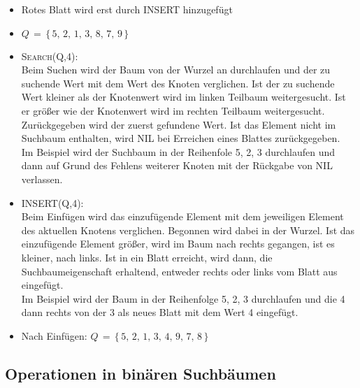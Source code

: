   \begin{itemize}
   \item Rotes Blatt wird erst durch INSERT hinzugefügt
   \item $Q\,=\,\{\,5,\,2,\,1,\,3,\,8,\,7,\,9\,\}$
   \item \textsc{Search}(Q,4): \\
      Beim Suchen wird der Baum von der Wurzel an durchlaufen und der zu 
      suchende Wert mit dem Wert des Knoten verglichen. Ist der zu suchende 
      Wert kleiner als der Knotenwert wird im linken Teilbaum weitergesucht. 
      Ist er größer wie der Knotenwert wird im rechten Teilbaum 
      weitergesucht. Zurückgegeben wird der zuerst gefundene Wert. Ist das 
      Element nicht im Suchbaum enthalten, wird NIL bei Erreichen eines 
      Blattes zurückgegeben.\\
      Im Beispiel wird der Suchbaum in der Reihenfole 5, 2, 3 durchlaufen 
      und dann auf Grund des Fehlens weiterer Knoten mit der Rückgabe von 
      NIL verlassen.
   \item INSERT(Q,4): \\
      Beim Einfügen wird das einzufügende Element mit dem jeweiligen 
      Element des aktuellen Knotens verglichen. Begonnen wird dabei in der 
      Wurzel. Ist das einzufügende Element größer, wird im Baum nach 
      rechts gegangen, ist es kleiner, nach links. Ist in ein 
      Blatt erreicht, wird dann, die Suchbaumeigenschaft erhaltend, entweder rechts oder 
      links vom Blatt aus eingefügt.\\
      Im Beispiel wird der Baum in der Reihenfolge 5, 2, 3 
      durchlaufen und die 4 dann rechts von der 3 als neues Blatt mit dem Wert 4
      eingefügt.
   \item Nach Einfügen: $Q\,=\,\{\,5,\,2,\,1,\,3,\,4,\,9,\,7,\,8\,\}$
  \end{itemize}

  \subsection{Operationen in binären Suchbäumen}

